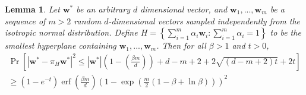 \documentclass{article}
\newtheorem{lemma}{Lemma}
\theoremstyle{definition}
\DeclareMathOperator*{\erf}{erf}
\DeclareMathOperator*{\probop}{Pr}
\newcommand{\prob}[1]{\ensuremath{\probop\left[{#1}\right]}}
\newcommand{\proj}[1]{\ensuremath{\pi}_{#1}}
\newcommand{\normal}[2]{\ensuremath{\mathcal{N}\left({{#1}},{{#2}}\right)}}
\newcommand{\w}{\mathbf{w}}
\begin{document}
\begin{lemma}
Let $\w^*$ be an arbitrary $d$ dimensional vector,
and $\w_1,...,\w_m$ be a sequence of $m>2$ random $d$-dimensional vectors sampled independently from the isotropic normal distribution.
Define $H= \left\{\sum_{i=1}^m \alpha_i\w_i : \sum_{i=1}^m\alpha_i = 1 \right\}$ to be the smallest hyperplane containing $\w_1,...,\w_m$.
Then for all $\beta>1$ and $t>0$,
\begin{multline}
\prob{
    |\w^*-\proj{H}\w^*|^2 \le
    |\w^*|\left(1-\left(\frac{\beta m}{d}\right)\right)
    +
    d - m + 2 + 2\sqrt{(d - m + 2)t} + 2t
}
\\
\ge
(1-e^{-t})
\erf\left(\frac{\beta m}{d}\right)
\left(1 - \exp\left(\frac{m}{2}(1-\beta+\ln\beta)\right)\right)^2
\end{multline}
\end{lemma}
\end{document}

